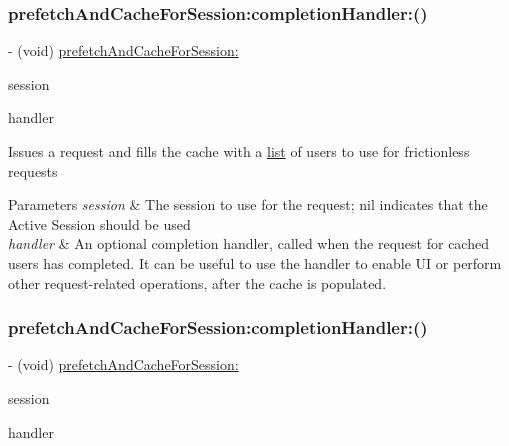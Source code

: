 \subsubsection{\texorpdfstring{prefetch\+And\+Cache\+For\+Session\+:completion\+Handler\+:()}{prefetchAndCacheForSession:completionHandler:()}\hspace{0.1cm}{\footnotesize\ttfamily [4/5]}}
{\footnotesize\ttfamily -\/ (void) \hyperlink{interfaceFBFrictionlessRecipientCache_a4f218828f2b6a8bb5a8e0044e98689dc}{prefetch\+And\+Cache\+For\+Session\+:} \begin{DoxyParamCaption}\item[{(\hyperlink{interfaceFBSession}{F\+B\+Session} $\ast$)}]{session }\item[{completionHandler:(F\+B\+Request\+Handler)}]{handler }\end{DoxyParamCaption}}

Issues a request and fills the cache with a \hyperlink{protocollist-p}{list} of users to use for frictionless requests


\begin{DoxyParams}{Parameters}
{\em session} & The session to use for the request; nil indicates that the Active Session should be used\\
\hline
{\em handler} & An optional completion handler, called when the request for cached users has completed. It can be useful to use the handler to enable UI or perform other request-\/related operations, after the cache is populated. \\
\hline
\end{DoxyParams}
\mbox{\label{interfaceFBFrictionlessRecipientCache_a4c4c0f1fd519bfff5b39f3433fad29e3}} 
\subsubsection{\texorpdfstring{prefetch\+And\+Cache\+For\+Session\+:completion\+Handler\+:()}{prefetchAndCacheForSession:completionHandler:()}\hspace{0.1cm}{\footnotesize\ttfamily [5/5]}}
{\footnotesize\ttfamily -\/ (void) \hyperlink{interfaceFBFrictionlessRecipientCache_a4f218828f2b6a8bb5a8e0044e98689dc}{prefetch\+And\+Cache\+For\+Session\+:} \begin{DoxyParamCaption}\item[{(\hyperlink{interfaceFBSession}{F\+B\+Session} $\ast$)}]{session }\item[{completionHandler:(F\+B\+Request\+Handler)}]{handler }\end{DoxyParamCaption}}

